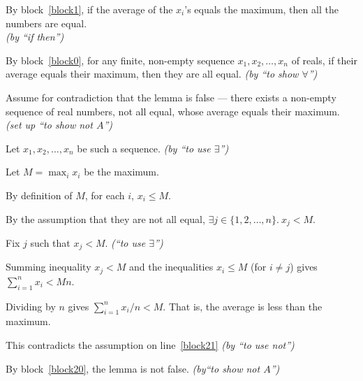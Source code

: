 \documentclass[11pt]{article}
\begin{document}
\begin{problems}
\begin{longFormProof}
\begin{block}[block0]
      \step By block~\ref{block1}, 
      if the average of the $x_i$'s equals the maximum,
      then all the numbers are equal.
      \\\mbox{}\hfill\emph{(by ``if then'')}
    \end{block}

    \step By block~\ref{block0},
    for any finite, non-empty sequence  $x_1, x_2,\ldots, x_n$ of reals,
    if their average equals their maximum,
    then they are all equal.
    \hfill\emph{(by ``to show $\forall$'')}
  \end{longFormProof}

  \begin{longFormProof}
    \begin{block}[block20]
      {Assume for contradiction that the lemma is false ---
      there exists a non-empty sequence of real numbers, not all equal,
      whose average equals their maximum.
      \hfill\emph{(set up  ``to show not $A$'')}}

      \step[block21] Let $x_1, x_2,\ldots, x_n$ be such a sequence.
      \hfill\emph{(by ``to use $\exists$'')}

      \step Let $M = \max_i x_i$ be the maximum.

      \step By definition of $M$, for each $i$, $x_i \le M$.

      \step By the assumption that they are not all equal,
      $\exists j\in\{1,2,\ldots,n\}.~x_j < M$.

      \step[block22] Fix $j$ such that $x_j < M$.  
      \hfill\emph{(``to use $\exists$'')}

      \step Summing inequality $x_j < M$ and the inequalities $x_i \le M$ 
      (for $i\ne j$) gives $\sum_{i=1}^n x_i < M n$.

      \step Dividing by $n$ gives $\sum_{i=1}^n x_i/n < M$.  
      That is, the average is less than the maximum.

      \step This contradicts the assumption on line~\ref{block21}
      \hfill\emph{(by ``to use not'')}
    \end{block}

    \step By block~\ref{block20}, the lemma is not false.
    \hfill\emph{(by``to show not $A$'')}
  \end{longFormProof}


  \newpage

  \problem


\end{problems}
\end{document}
